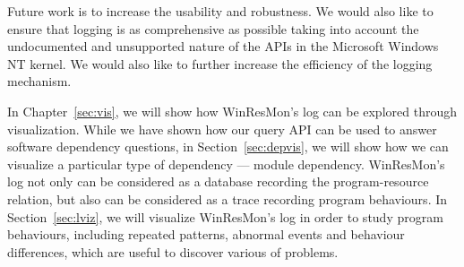 Future work is to increase the usability and robustness.
We would also like to ensure that logging is as comprehensive as possible
taking into account the undocumented
and unsupported nature of the APIs in the Microsoft Windows NT kernel.
We would also like to further increase the efficiency of the
logging mechanism.

In Chapter~\ref{sec:vis}, we will show how WinResMon's log can be explored
through visualization.
While we have shown how our query API can be used to answer software
dependency questions,
in Section~\ref{sec:depvis}, we will show how we can visualize
a particular type of dependency --- module dependency.
WinResMon's log not only can be considered as a database recording
the program-resource relation, but also can be considered as a trace
recording program behaviours.
In Section~\ref{sec:lviz}, we will visualize WinResMon's log in order
to study program behaviours, including repeated patterns, abnormal events
and behaviour differences,
which are useful to discover various of problems.

